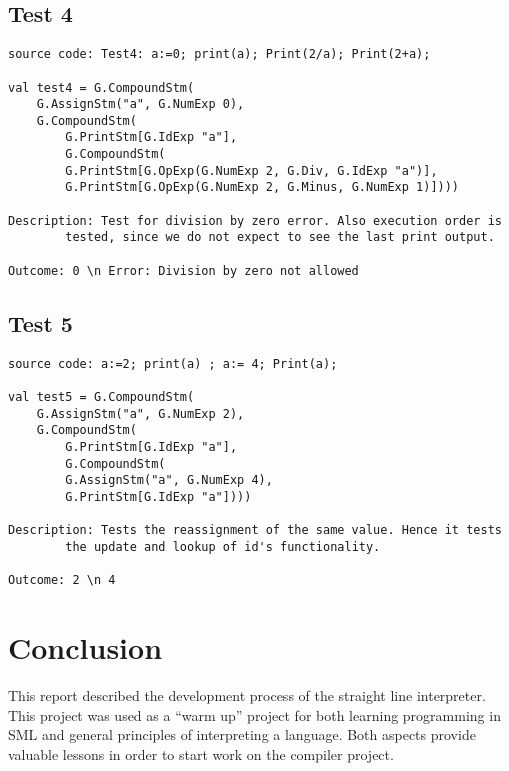\documentclass[a4paper]{article}
\begin{document}
\subsection{Test 4}
\begin{lstlisting}
source code: Test4: a:=0; print(a); Print(2/a); Print(2+a);

val test4 = G.CompoundStm(
	G.AssignStm("a", G.NumExp 0),
	G.CompoundStm(
	    G.PrintStm[G.IdExp "a"],
	    G.CompoundStm(
		G.PrintStm[G.OpExp(G.NumExp 2, G.Div, G.IdExp "a")],
		G.PrintStm[G.OpExp(G.NumExp 2, G.Minus, G.NumExp 1)])))

Description: Test for division by zero error. Also execution order is
		tested, since we do not expect to see the last print output.

Outcome: 0 \n Error: Division by zero not allowed
\end{lstlisting}

\subsection{Test 5}
\begin{lstlisting}
source code: a:=2; print(a) ; a:= 4; Print(a);

val test5 = G.CompoundStm(
	G.AssignStm("a", G.NumExp 2),
	G.CompoundStm(
	    G.PrintStm[G.IdExp "a"],
	    G.CompoundStm(
		G.AssignStm("a", G.NumExp 4),
		G.PrintStm[G.IdExp "a"])))

Description: Tests the reassignment of the same value. Hence it tests
		the update and lookup of id's functionality.

Outcome: 2 \n 4
\end{lstlisting}



\section{Conclusion}
This report described the development process of the straight line interpreter. This project was used as a ``warm up'' project for both learning programming in SML and general principles of interpreting a language. Both aspects provide valuable lessons in order to start work on the compiler project. 
\end{document}
